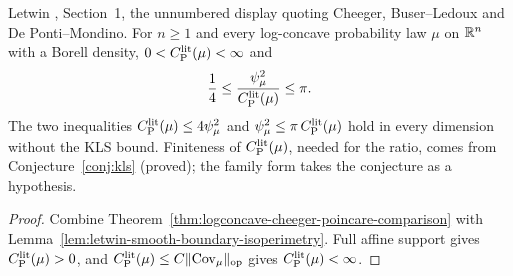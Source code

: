 \begin{theorem}
  \label{thm:letwin-cheeger-buser-ratio}
  \leanok
  Letwin \cite{Letwin2026QuadraticKLS}, Section~1, the unnumbered display quoting Cheeger, Buser--Ledoux and De
  Ponti--Mondino. For $n\ge1$ and every log-concave probability law $\mu$ on $\mathbb{R}^n$ with a Borell density,
  $0<C_{\mathrm P}^{\mathrm{lit}}(\mu)<\infty$ and
  \[
    \frac14\le\frac{\psi_\mu^2}{C_{\mathrm P}^{\mathrm{lit}}(\mu)}\le\pi .
  \]
  The two inequalities $C_{\mathrm P}^{\mathrm{lit}}(\mu)\le4\psi_\mu^2$ and $\psi_\mu^2\le\pi\,C_{\mathrm P}^{\mathrm{lit}}(\mu)$ hold in every dimension without
  the KLS bound. Finiteness of $C_{\mathrm P}^{\mathrm{lit}}(\mu)$, needed for the ratio, comes from Conjecture~\ref{conj:kls} (proved); the
  family form takes the conjecture as a hypothesis.
\end{theorem}
\begin{proof}
  \leanok
  Combine Theorem~\ref{thm:logconcave-cheeger-poincare-comparison} with
  Lemma~\ref{lem:letwin-smooth-boundary-isoperimetry}. Full affine support gives $C_{\mathrm P}^{\mathrm{lit}}(\mu)>0$, and
  $C_{\mathrm P}^{\mathrm{lit}}(\mu)\le C\lVert\operatorname{Cov}_\mu\rVert_{\mathrm{op}}$ gives $C_{\mathrm P}^{\mathrm{lit}}(\mu)<\infty$.
\end{proof}

